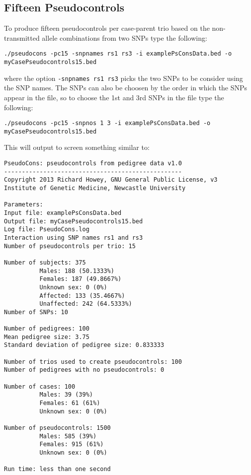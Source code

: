 \documentclass[a4paper,12pt]{article}
\newcommand{\code}[1]{{\footnotesize{{\tt #1}}}}
\begin{document}

\subsection{Fifteen Pseudocontrols}
\label{eg-pseudocons15}

To produce fifteen pseudocontrols per case-parent trio based on the non-transmitted allele combinations from two SNPs type the following: 
\begin{verbatim}
./pseudocons -pc15 -snpnames rs1 rs3 -i examplePsConsData.bed -o myCasePseudocontrols15.bed
\end{verbatim}

where the option \code{-snpnames rs1 rs3} picks the two SNPs to be consider using the SNP names. The SNPs can also be choosen by the order in which the SNPs appear in the file, so to choose the 1st and 3rd SNPs in the file type the following: 
\begin{verbatim}
./pseudocons -pc15 -snpnos 1 3 -i examplePsConsData.bed -o myCasePseudocontrols15.bed
\end{verbatim}

This will output to screen something similar to: 
\begin{verbatim}
PseudoCons: pseudocontrols from pedigree data v1.0
--------------------------------------------------
Copyright 2013 Richard Howey, GNU General Public License, v3
Institute of Genetic Medicine, Newcastle University

Parameters:
Input file: examplePsConsData.bed
Output file: myCasePseudocontrols15.bed
Log file: PseudoCons.log
Interaction using SNP names rs1 and rs3
Number of pseudocontrols per trio: 15

Number of subjects: 375
          Males: 188 (50.1333%)
          Females: 187 (49.8667%)
          Unknown sex: 0 (0%)
          Affected: 133 (35.4667%)
          Unaffected: 242 (64.5333%)
Number of SNPs: 10

Number of pedigrees: 100
Mean pedigree size: 3.75
Standard deviation of pedigree size: 0.833333

Number of trios used to create pseudocontrols: 100
Number of pedigrees with no pseudocontrols: 0

Number of cases: 100
          Males: 39 (39%)
          Females: 61 (61%)
          Unknown sex: 0 (0%)

Number of pseudocontrols: 1500
          Males: 585 (39%)
          Females: 915 (61%)
          Unknown sex: 0 (0%)

Run time: less than one second
\end{verbatim}
\end{document}
